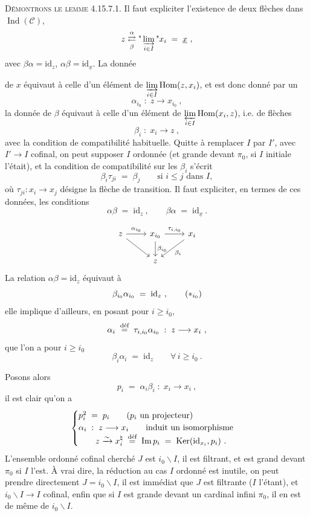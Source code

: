 \documentclass[11pt]{article}
\newcommand{\printedpage}[1]{\marginpar{\footnotesize p.~#1}}
\newcommand{\msp}[1]{\marginpar{\footnotesize [#1]}}
\newcommand{\ux}{\underline{x}}
\newcommand{\cC}{\mathcal{C}}
\newcommand{\id}{\mathrm{id}}
\newcommand{\Hom}{\operatorname{Hom}}
\newcommand{\Ind}{\operatorname{Ind}}
\newcommand{\Img}{\operatorname{Im}}
\newcommand{\Ker}{\operatorname{Ker}}
\newcommand{\defeq}{\overset{\text{\upshape déf}}{=}}
\begin{document}
\textsc{Démontrons le lemme} 4.15.7.1. Il faut expliciter l'existence de deux flèches dans $\Ind(\cC)$,
\[
z \underset{\beta}{\overset{\alpha}{\rightleftarrows}} \text{"}\varinjlim_{i\in I}\text{"} x_i \;=\; \ux\ ,
\]
avec $\beta\alpha = \id_z$, $\alpha\beta = \id_{\ux}$. La donnée

\msp{page 449}
de $x$ équivaut à celle d'un élément de $\varinjlim\limits_{i\in I} \Hom(z,x_i)$, et est donc donné par un %
\[
\alpha_{i_0} \;:\; z \longrightarrow x_{i_0}\ ,
\]
la donnée de $\beta$ équivaut à celle d'un élément de $\varprojlim\limits_{i\in I} \Hom(x_i,z)$, i.e. de flèches
\[
\beta_i \;:\; x_i \longrightarrow z\ ,
\]
avec la condition de compatibilité habituelle. Quitte à remplacer $I$ par $I'$, avec $I' \longrightarrow I$ cofinal, on peut supposer $I$ ordonnée (et grande devant $\pi_0$, si $I$ initiale l'était), et la condition de compatibilité sur les $\beta_i$ s'écrit
\[
\beta_i\tau_{ji} \;=\; \beta_j \qquad \text{si } i \leqslant j \text{ dans } I,
\]
où $\tau_{ji} : x_i \longrightarrow x_j$ désigne la flèche de transition. Il faut expliciter, en termes de ces données, les conditions
\[
\alpha\beta \;=\; \id_z\ , \qquad \beta\alpha \;=\; \id_{\ux}\ .
\]

\printedpage{173}
\[
\begin{tikzcd}
z \arrow[r, "\alpha_{i_0}"] \arrow[dr] & x_{i_0} \arrow[r, "\tau_{i,i_0}"] \arrow[d, "\beta_{i_0}"] & x_i \arrow[dl, "\beta_i"] \\
 & z &
\end{tikzcd}
\]
La relation $\alpha\beta = \id_z$ équivaut à
\[
\beta_{i_0}\alpha_{i_0} \;=\; \id_z\ , \tag*{$(*_{i_0})$}
\]
elle implique d'ailleurs, en posant pour $i \geqslant i_0$,
\[
\alpha_i \;\defeq\; \tau_{i,i_0}\alpha_{i_0} \;:\; z \longrightarrow x_i\ ,
\]
que l'on a pour $i \geqslant i_0$
\[
\beta_i\alpha_i \;=\; \id_z \qquad \forall\, i \geqslant i_0\ . \tag*{$(*_i)$}
\]

\msp{page 450}
Posons alors
\[
p_i \;=\; \alpha_i\beta_i \;:\; x_i \longrightarrow x_i\ ,
\]
il est clair qu'on a
\[
\begin{cases}
p_i^2 \;=\; p_i \qquad \text{($p_i$ un projecteur)} \\
\alpha_i \;:\; z \longrightarrow x_i \qquad \text{induit un isomorphisme} \\
\qquad z \xrightarrow{\sim} x_i^\natural \;\defeq\; \Img p_i \;=\; \Ker(\id_{x_i},p_i)\ .
\end{cases}
\]
L'ensemble ordonné cofinal cherché $J$ est $i_0\backslash I$, il est filtrant, et est grand devant $\pi_0$ si $I$ l'est. À vrai dire, la réduction au cas $I$ ordonné est inutile, on peut prendre directement $J = i_0\backslash I$, il est immédiat que $J$ est filtrante ($I$ l'étant), et $i_0\backslash I \longrightarrow I$ cofinal, enfin que si $I$ est grande devant un cardinal infini $\pi_0$, il en est de même de $i_0\backslash I$.
\end{document}
